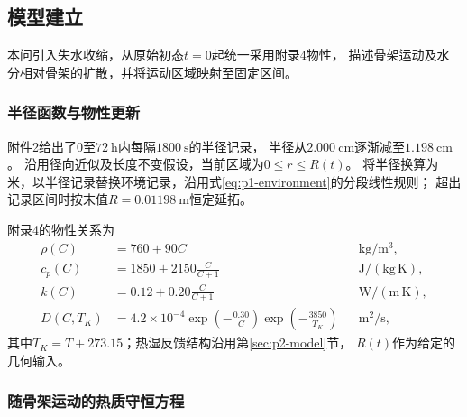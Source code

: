 \subsection{模型建立}
\label{sec:p4-model}

本问引入失水收缩，从原始初态$t=0$起统一采用附录4物性，
描述骨架运动及水分相对骨架的扩散，并将运动区域映射至固定区间。

\subsubsection{半径函数与物性更新}

附件2给出了$0$至$72\ \mathrm{h}$内每隔$1800\ \mathrm{s}$的半径记录，
半径从$2.000\ \mathrm{cm}$逐渐减至$1.198\ \mathrm{cm}$。
沿用径向近似及长度不变假设，当前区域为$0\le r\le R(t)$。
将半径换算为米，以半径记录替换环境记录，沿用式\eqref{eq:p1-environment}的分段线性规则；
超出记录区间时按末值$R=0.01198\ \mathrm{m}$恒定延拓。

附录4的物性关系为
\begin{equation}
\begin{aligned}
  \rho(C)&=760+90C
    &&\mathrm{kg/m^3},\\
  c_p(C)&=1850+2150\frac{C}{C+1}
    &&\mathrm{J/(kg\,K)},\\
  k(C)&=0.12+0.20\frac{C}{C+1}
    &&\mathrm{W/(m\,K)},\\
  D(C,T_K)&=4.2\times10^{-4}
    \exp\!\left(-\frac{0.30}{C}\right)
    \exp\!\left(-\frac{3850}{T_K}\right)
    &&\mathrm{m^2/s},
\end{aligned}
\label{eq:p4-properties}
\end{equation}
其中$T_K=T+273.15$；热湿反馈结构沿用第\ref{sec:p2-model}节，
$R(t)$作为给定的几何输入。

\subsubsection{随骨架运动的热质守恒方程}

